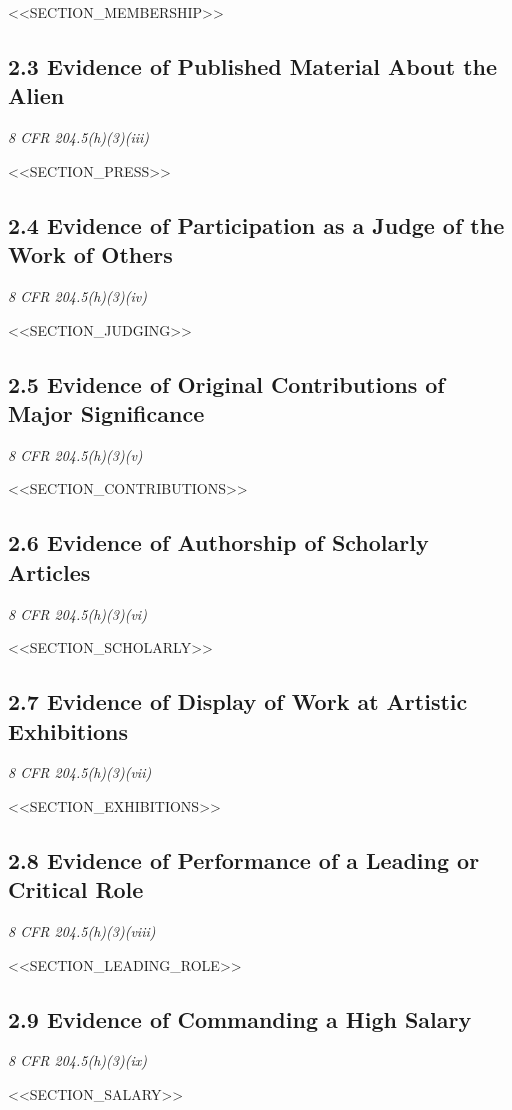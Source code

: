 \documentclass[12pt,letterpaper]{article}
\begin{document}
<<SECTION_MEMBERSHIP>>

\subsection*{2.3 Evidence of Published Material About the Alien}
\textit{8 CFR 204.5(h)(3)(iii)}

<<SECTION_PRESS>>

\subsection*{2.4 Evidence of Participation as a Judge of the Work of Others}
\textit{8 CFR 204.5(h)(3)(iv)}

<<SECTION_JUDGING>>

\subsection*{2.5 Evidence of Original Contributions of Major Significance}
\textit{8 CFR 204.5(h)(3)(v)}

<<SECTION_CONTRIBUTIONS>>

\subsection*{2.6 Evidence of Authorship of Scholarly Articles}
\textit{8 CFR 204.5(h)(3)(vi)}

<<SECTION_SCHOLARLY>>

\subsection*{2.7 Evidence of Display of Work at Artistic Exhibitions}
\textit{8 CFR 204.5(h)(3)(vii)}

<<SECTION_EXHIBITIONS>>

\subsection*{2.8 Evidence of Performance of a Leading or Critical Role}
\textit{8 CFR 204.5(h)(3)(viii)}

<<SECTION_LEADING_ROLE>>

\subsection*{2.9 Evidence of Commanding a High Salary}
\textit{8 CFR 204.5(h)(3)(ix)}

<<SECTION_SALARY>>
\end{document}
